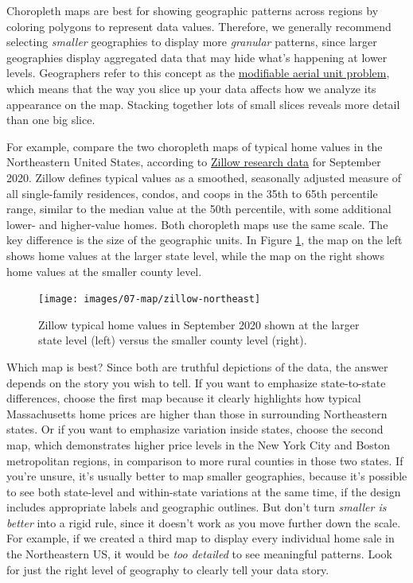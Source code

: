 \documentclass[
  english,
]{book}
\begin{document}
Choropleth maps are best for showing geographic patterns across regions by coloring polygons to represent data values. Therefore, we generally recommend selecting \emph{smaller} geographies to display more \emph{granular} patterns, since larger geographies display aggregated data that may hide what's happening at lower levels. Geographers refer to this concept as the \href{https://en.wikipedia.org/wiki/Modifiable_areal_unit_problem}{modifiable aerial unit problem}, which means that the way you slice up your data affects how we analyze its appearance on the map. Stacking together lots of small slices reveals more detail than one big slice.

For example, compare the two choropleth maps of typical home values in the Northeastern United States, according to \href{https://www.zillow.com/research/data/}{Zillow research data} for September 2020. Zillow defines typical values as a smoothed, seasonally adjusted measure of all single-family residences, condos, and coops in the 35th to 65th percentile range, similar to the median value at the 50th percentile, with some additional lower- and higher-value homes. Both choropleth maps use the same scale. The key difference is the size of the geographic units. In Figure \ref{fig:zillow-northeast}, the map on the left shows home values at the larger state level, while the map on the right shows home values at the smaller county level.



\begin{figure}
\texttt{[image: images/07-map/zillow-northeast]} \caption{Zillow typical home values in September 2020 shown at the larger state level (left) versus the smaller county level (right).}\label{fig:zillow-northeast}
\end{figure}

Which map is best? Since both are truthful depictions of the data, the answer depends on the story you wish to tell. If you want to emphasize state-to-state differences, choose the first map because it clearly highlights how typical Massachusetts home prices are higher than those in surrounding Northeastern states. Or if you want to emphasize variation inside states, choose the second map, which demonstrates higher price levels in the New York City and Boston metropolitan regions, in comparison to more rural counties in those two states. If you're unsure, it's usually better to map smaller geographies, because it's possible to see both state-level and within-state variations at the same time, if the design includes appropriate labels and geographic outlines. But don't turn \emph{smaller is better} into a rigid rule, since it doesn't work as you move further down the scale. For example, if we created a third map to display every individual home sale in the Northeastern US, it would be \emph{too detailed} to see meaningful patterns. Look for just the right level of geography to clearly tell your data story.
\end{document}
